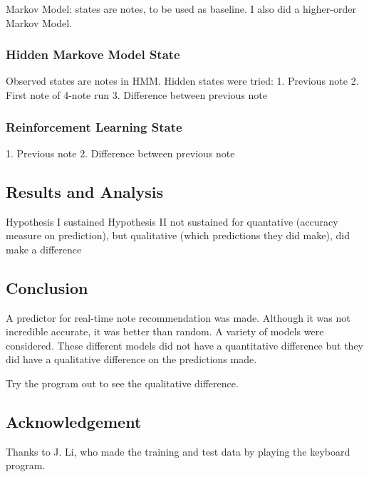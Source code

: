 \documentclass{article}
\begin{document}
Markov Model: states are notes, to be used as baseline. I also did a higher-order Markov Model.

\subsubsection*{Hidden Markove Model State}
Observed states are notes in HMM.
Hidden states were tried:
1. Previous note
2. First note of 4-note run
3. Difference between previous note

\subsubsection*{Reinforcement Learning State}
1. Previous note
2. Difference between previous note

\subsection*{Results and Analysis}
Hypothesis I sustained
Hypothesis II not sustained for quantative (accuracy measure on prediction), but qualitative (which predictions they did make), did make a difference

\subsection*{Conclusion}
A predictor for real-time note recommendation was made. Although it was not incredible accurate, it was better than random. A variety of models were considered. These different models did not have a quantitative difference but they did have a qualitative difference on the predictions made.

Try the program out to see the qualitative difference.

\subsection*{Acknowledgement}
Thanks to J. Li, who made the training and test data by playing the keyboard program.
\end{document}
